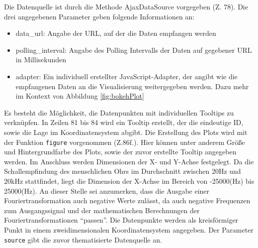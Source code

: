 Die Datenquelle ist durch die Methode AjaxDataSource vorgegeben (Z. 78). Die drei angegebenen Parameter geben folgende Informationen an:

\begin{itemize}
	\item data\_url: Angabe der URL, auf der die Daten empfangen werden
	\item polling\_interval: Angabe des Polling Intervalls der Daten auf gegebener URL in Millisekunden
	\item adapter: Ein individuell erstellter JavaScript-Adapter, der angibt wie die empfangenen Daten an die Visualisierung weitergegeben werden. Dazu mehr im Kontext von Abbildung \ref{fig:bokehPlot}
\end{itemize}

Es besteht die Möglichkeit, die Datenpunkten mit individuellen Tooltips zu verknüpfen. In Zeilen 81 bis 84 wird ein Tooltip erstellt, der die eindeutige ID, sowie die Lage im Koordinatensystem abgibt.
Die Erstellung des Plots wird mit der Funktion \texttt{figure} vorgenommen (Z.86f.). Hier können unter anderem Größe und Hintergrundfarbe des Plots, sowie der zuvor erstellte Tooltip angegeben werden. Im Anschluss werden Dimensionen der X- und Y-Achse festgelegt. Da die Schallempfindung des menschlichen Ohrs im Durchschnitt zwischen 20Hz und 20kHz stattfindet, liegt die Dimension der X-Achse im Bereich von -25000(Hz) bis 25000(Hz). An dieser Stelle sei anzumerken, dass die Ausgabe einer Fouriertransformation auch negative Werte zulässt, da auch negative Frequenzen zum Ausgangssignal und der mathematischen Berechnungen der Fouriertransformationen \enquote{passen}. Die Datenpunkte werden als kreisförmiger Punkt in einem zweidimensionalen Koordinatensystem angegeben. Der Parameter \texttt{source} gibt die zuvor thematisierte Datenquelle an.

